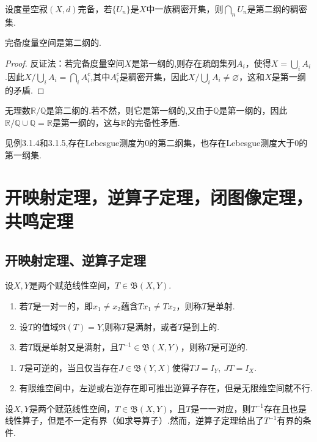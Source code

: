 \documentclass[lang=cn,10pt]{elegantbook}
\begin{document}
	\begin{theorem}[强Baire纲定理(3.1.2)]
		设度量空寂\((X,d)\)完备，若\(\{U_n\}\)是\(X\)中一族稠密开集，则\(\bigcap_n U_n\)是第二纲的稠密集.
	\end{theorem}
	\begin{theorem}[Baire(3.1.1)]
		完备度量空间是第二纲的.
	\end{theorem}
	\begin{proof}
		反证法：若完备度量空间\(X\)是第一纲的,则存在疏朗集列\(A_i\)，使得\(X=\bigcup_i A_i\).因此\(X/\bigcup_i A_i=\bigcap_i A_i^c\),其中\(A_i^c\)是稠密开集，因此\(X/\bigcup_i A_i\ne \varnothing\)，这和\(X\)是第一纲的矛盾.
	\end{proof}
	\begin{example}
		无理数\(\mathbb{R}/\mathbb{Q}\)是第二纲的.若不然，则它是第一纲的,又由于\(\mathbb{Q}\)是第一纲的，因此\(\mathbb{R}/\mathbb{Q}\cup \mathbb{Q}=\mathbb{R}\)是第一纲的，这与\(\mathbb{R}\)的完备性矛盾.
	\end{example}
	\begin{example}
		见例3.1.4和3.1.5,存在Lebesgue测度为0的第二纲集，也存在Lebesgue测度大于0的第一纲集.
	\end{example}
	
	\section{开映射定理，逆算子定理，闭图像定理，共鸣定理}
	\subsection{开映射定理、逆算子定理}
	\begin{definition}
		设\(X,Y\)是两个赋范线性空间，\(T\in \mathfrak{B}(X,Y)\).
		\begin{enumerate}
			\item 若\(T\)是一对一的，即\(x_1\ne x_2\)蕴含\(Tx_1\ne Tx_2\)，则称\(T\)是单射.
			\item 设\(T\)的值域\(\mathfrak{R}(T)=Y\),则称\(T\)是满射，或者\(T\)是到上的.
			\item 若\(T\)既是单射又是满射，且\(T^{-1}\in  \mathfrak{B}(X,Y)\)，则称\(T\)是可逆的.
		\end{enumerate}
	\end{definition}
	\begin{note}
		\begin{enumerate}
			\item \(T\)是可逆的，当且仅当存在\(J\in \mathfrak{B}(Y,X)\)使得\(TJ=I_Y,\ JT=I_X\).
			\item 有限维空间中，左逆或右逆存在即可推出逆算子存在，但是无限维空间就不行.
		\end{enumerate}
	\end{note}
	设\(X,Y\)是两个赋范线性空间，\(T\in \mathfrak{B}(X,Y)\)，且\(T\)是一一对应，则\(T^{-1}\)存在且也是线性算子，但是不一定有界（如求导算子）.然而，逆算子定理给出了\(T^{-1}\)有界的条件.
	
\end{document}

